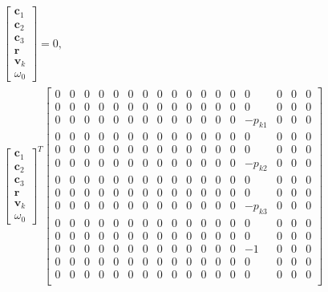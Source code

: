 \documentclass{article}
\begin{document}
\begin{align}
    \begin{bmatrix}
        \mathbf{c}_1 \\
        \mathbf{c}_2 \\
        \mathbf{c}_3 \\
        \mathbf{r} \\
        \mathbf{v}_k \\
        \omega_0
    \end{bmatrix} = 0, \\
    \begin{bmatrix}
        \mathbf{c}_1 \\
        \mathbf{c}_2 \\
        \mathbf{c}_3 \\
        \mathbf{r} \\
        \mathbf{v}_k \\
        \omega_0
    \end{bmatrix}^T 
    \begin{bmatrix}
        0 & 0 & 0 & 0 & 0 & 0 & 0 & 0 & 0 & 0 & 0 & 0 & 0 & 0 & 0 & 0 & 0 \\
        0 & 0 & 0 & 0 & 0 & 0 & 0 & 0 & 0 & 0 & 0 & 0 & 0 & 0 & 0 & 0 & 0 \\
        0 & 0 & 0 & 0 & 0 & 0 & 0 & 0 & 0 & 0 & 0 & 0 & 0 & -p_{k1} & 0 & 0 & 0 \\
        0 & 0 & 0 & 0 & 0 & 0 & 0 & 0 & 0 & 0 & 0 & 0 & 0 & 0 & 0 & 0 & 0 \\
        0 & 0 & 0 & 0 & 0 & 0 & 0 & 0 & 0 & 0 & 0 & 0 & 0 & 0 & 0 & 0 & 0 \\
        0 & 0 & 0 & 0 & 0 & 0 & 0 & 0 & 0 & 0 & 0 & 0 & 0 & -p_{k2} & 0 & 0 & 0 \\
        0 & 0 & 0 & 0 & 0 & 0 & 0 & 0 & 0 & 0 & 0 & 0 & 0 & 0 & 0 & 0 & 0 \\
        0 & 0 & 0 & 0 & 0 & 0 & 0 & 0 & 0 & 0 & 0 & 0 & 0 & 0 & 0 & 0 & 0 \\
        0 & 0 & 0 & 0 & 0 & 0 & 0 & 0 & 0 & 0 & 0 & 0 & 0 & -p_{k3} & 0 & 0 & 0 \\
        0 & 0 & 0 & 0 & 0 & 0 & 0 & 0 & 0 & 0 & 0 & 0 & 0 & 0 & 0 & 0 & 0 \\
        0 & 0 & 0 & 0 & 0 & 0 & 0 & 0 & 0 & 0 & 0 & 0 & 0 & 0 & 0 & 0 & 0 \\
        0 & 0 & 0 & 0 & 0 & 0 & 0 & 0 & 0 & 0 & 0 & 0 & 0 & -1 & 0 & 0 & 0 \\
        0 & 0 & 0 & 0 & 0 & 0 & 0 & 0 & 0 & 0 & 0 & 0 & 0 & 0 & 0 & 0 & 0 \\
        0 & 0 & 0 & 0 & 0 & 0 & 0 & 0 & 0 & 0 & 0 & 0 & 0 & 0 & 0 & 0 & 0 \\

\end{bmatrix}
\end{align}
\end{document}
